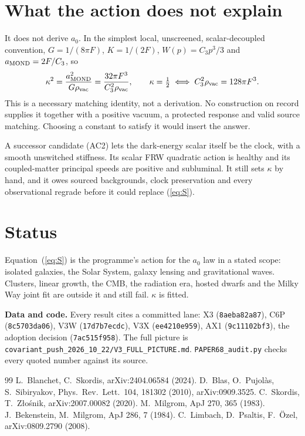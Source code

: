 \documentclass[10pt]{article}
\begin{document}
\section{What the action does not explain}
It does not derive $a_0$. In the simplest local, unscreened, scalar-decoupled convention, $G=1/(8\pi F)$, $K=1/(2F)$, $W(p)=C_3p^3/3$ and $a_{\rm MOND}=2F/C_3$, so
\begin{equation}
\kappa^2=\frac{a_{\rm MOND}^2}{G\rho_{\rm vac}}=\frac{32\pi F^3}{C_3^2\rho_{\rm vac}},\qquad \kappa=\tfrac12\iff C_3^2\rho_{\rm vac}=128\pi F^3 .
\end{equation}
This is a necessary matching identity, not a derivation. No construction on record supplies it together with a positive vacuum, a protected response and valid source matching. Choosing a constant to satisfy it would insert the answer.

A successor candidate (AC2) lets the dark-energy scalar itself be the clock, with a smooth unswitched stiffness. Its scalar FRW quadratic action is healthy and its coupled-matter principal speeds are positive and subluminal. It still sets $\kappa$ by hand, and it owes sourced backgrounds, clock preservation and every observational regrade before it could replace (\ref{eq:S}).

\section{Status}
Equation~(\ref{eq:S}) is the programme's action for the $a_0$ law in a stated scope: isolated galaxies, the Solar System, galaxy lensing and gravitational waves. Clusters, linear growth, the CMB, the radiation era, hosted dwarfs and the Milky Way joint fit are outside it and still fail. $\kappa$ is fitted.

\textbf{Data and code.} Every result cites a committed lane: X3 (\texttt{8aeba82a87}), C6P (\texttt{8c5703da06}), V3W (\texttt{17d7b7ecdc}), V3X (\texttt{ee4210e959}), AX1 (\texttt{9c11102bf3}), the adoption decision (\texttt{7ac515f958}). The full picture is \texttt{covariant\_push\_2026\_10\_22/V3\_FULL\_PICTURE.md}. \texttt{PAPER68\_audit.py} checks every quoted number against its source.

\begin{thebibliography}{99}\small
{} L.~Blanchet, C.~Skordis, arXiv:2404.06584 (2024).
 D.~Blas, O.~Pujol\`as, S.~Sibiryakov, Phys.\ Rev.\ Lett.\ 104, 181302 (2010), arXiv:0909.3525.
 C.~Skordis, T.~Z\l{}o\'snik, arXiv:2007.00082 (2020).
 M.~Milgrom, ApJ 270, 365 (1983).
 J.~Bekenstein, M.~Milgrom, ApJ 286, 7 (1984).
 C.~Limbach, D.~Psaltis, F.~\"Ozel, arXiv:0809.2790 (2008).
\end{thebibliography}
\end{document}
